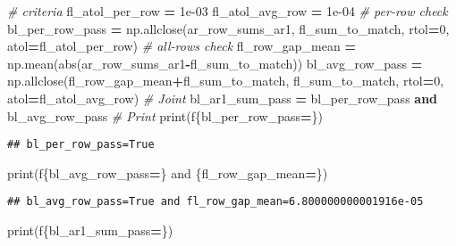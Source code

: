 \documentclass[
]{book}
\newenvironment{Shaded}{\begin{snugshade}}{\end{snugshade}}
\newcommand{\BuiltInTok}[1]{#1}
\newcommand{\CommentTok}[1]{\textcolor[rgb]{0.56,0.35,0.01}{\textit{#1}}}
\newcommand{\DecValTok}[1]{\textcolor[rgb]{0.00,0.00,0.81}{#1}}
\newcommand{\FloatTok}[1]{\textcolor[rgb]{0.00,0.00,0.81}{#1}}
\newcommand{\KeywordTok}[1]{\textcolor[rgb]{0.13,0.29,0.53}{\textbf{#1}}}
\newcommand{\NormalTok}[1]{#1}
\newcommand{\OperatorTok}[1]{\textcolor[rgb]{0.81,0.36,0.00}{\textbf{#1}}}
\newcommand{\SpecialCharTok}[1]{\textcolor[rgb]{0.00,0.00,0.00}{#1}}
\newcommand{\SpecialStringTok}[1]{\textcolor[rgb]{0.31,0.60,0.02}{#1}}
\begin{document}
\begin{Shaded}
\begin{Highlighting}[]
\CommentTok{\# criteria}
\NormalTok{fl\_atol\_per\_row }\OperatorTok{=} \FloatTok{1e{-}03}
\NormalTok{fl\_atol\_avg\_row }\OperatorTok{=} \FloatTok{1e{-}04}
\CommentTok{\# per{-}row check}
\NormalTok{bl\_per\_row\_pass }\OperatorTok{=}\NormalTok{ np.allclose(ar\_row\_sums\_ar1, fl\_sum\_to\_match, rtol}\OperatorTok{=}\DecValTok{0}\NormalTok{, atol}\OperatorTok{=}\NormalTok{fl\_atol\_per\_row)}
\CommentTok{\# all{-}rows check}
\NormalTok{fl\_row\_gap\_mean }\OperatorTok{=}\NormalTok{ np.mean(}\BuiltInTok{abs}\NormalTok{(ar\_row\_sums\_ar1}\OperatorTok{{-}}\NormalTok{fl\_sum\_to\_match))}
\NormalTok{bl\_avg\_row\_pass }\OperatorTok{=}\NormalTok{ np.allclose(fl\_row\_gap\_mean}\OperatorTok{+}\NormalTok{fl\_sum\_to\_match, fl\_sum\_to\_match, rtol}\OperatorTok{=}\DecValTok{0}\NormalTok{, atol}\OperatorTok{=}\NormalTok{fl\_atol\_avg\_row)}
\CommentTok{\# Joint}
\NormalTok{bl\_ar1\_sum\_pass }\OperatorTok{=}\NormalTok{ bl\_per\_row\_pass }\KeywordTok{and}\NormalTok{ bl\_avg\_row\_pass}
\CommentTok{\# Print}
\BuiltInTok{print}\NormalTok{(}\SpecialStringTok{f\textquotesingle{}}\SpecialCharTok{\{}\NormalTok{bl\_per\_row\_pass}\OperatorTok{=}\SpecialCharTok{\}}\SpecialStringTok{\textquotesingle{}}\NormalTok{)}
\end{Highlighting}
\end{Shaded}

\begin{verbatim}
## bl_per_row_pass=True
\end{verbatim}

\begin{Shaded}
\begin{Highlighting}[]
\BuiltInTok{print}\NormalTok{(}\SpecialStringTok{f\textquotesingle{}}\SpecialCharTok{\{}\NormalTok{bl\_avg\_row\_pass}\OperatorTok{=}\SpecialCharTok{\}}\SpecialStringTok{ and }\SpecialCharTok{\{}\NormalTok{fl\_row\_gap\_mean}\OperatorTok{=}\SpecialCharTok{\}}\SpecialStringTok{\textquotesingle{}}\NormalTok{)}
\end{Highlighting}
\end{Shaded}

\begin{verbatim}
## bl_avg_row_pass=True and fl_row_gap_mean=6.800000000001916e-05
\end{verbatim}

\begin{Shaded}
\begin{Highlighting}[]
\BuiltInTok{print}\NormalTok{(}\SpecialStringTok{f\textquotesingle{}}\SpecialCharTok{\{}\NormalTok{bl\_ar1\_sum\_pass}\OperatorTok{=}\SpecialCharTok{\}}\SpecialStringTok{\textquotesingle{}}\NormalTok{)}
\end{Highlighting}
\end{Shaded}
\end{document}
